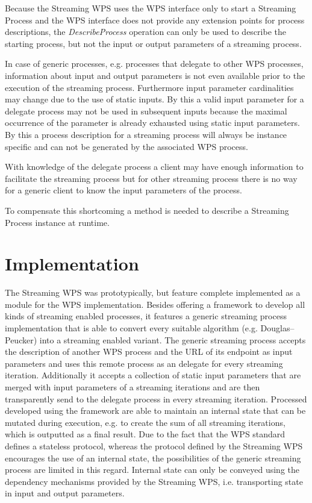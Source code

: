 		Because the Streaming \ac{WPS} uses the \ac{WPS} interface only to start a Streaming Process and the \ac{WPS} interface does not provide any extension points for process descriptions, the \emph{DescribeProcess} operation can only be used to describe the starting process, but not the input or output parameters of a streaming process.

		In case of generic processes, e.g. processes that delegate to other \ac{WPS} processes, information about input and output parameters is not even available prior to the execution of the streaming process. Furthermore input parameter cardinalities may change due to the use of static inputs. By this a valid input parameter for a delegate process may not be used in subsequent inputs because the maximal occurrence of the parameter is already exhausted using static input parameters. By this a process description for a streaming process will always be instance specific and can not be generated by the associated \ac{WPS} process.

		With knowledge of the delegate process a client may have enough information to facilitate the streaming process but for other streaming process there is no way for a generic client to know the input parameters of the process.

		To compensate this shortcoming a method is needed to describe a Streaming Process instance at runtime.

	\section{Implementation}
		The Streaming WPS was prototypically, but feature complete implemented as a module for the \ftn WPS implementation. Besides offering a framework to develop all kinds of streaming enabled processes, it features a generic streaming process implementation that is able to convert every suitable algorithm (e.g. Douglas–Peucker) into a streaming enabled variant. The generic streaming process accepts the description of another WPS process and the URL of its endpoint as input parameters and uses this remote process as an delegate for every streaming iteration. Additionally it accepts a collection of static input parameters that are merged with input parameters of a streaming iterations and are then transparently send to the delegate process in every streaming iteration. Processed developed using the framework are able to maintain an internal state that can be mutated during execution, e.g. to create the sum of all streaming iterations, which is outputted as a final result. Due to the fact that the WPS standard defines a stateless protocol, whereas the protocol defined by the Streaming WPS encourages the use of an internal state, the possibilities of the generic streaming process are limited in this regard. Internal state can only be conveyed using the dependency mechanisms provided by the Streaming WPS, i.e. transporting state in input and output parameters.


